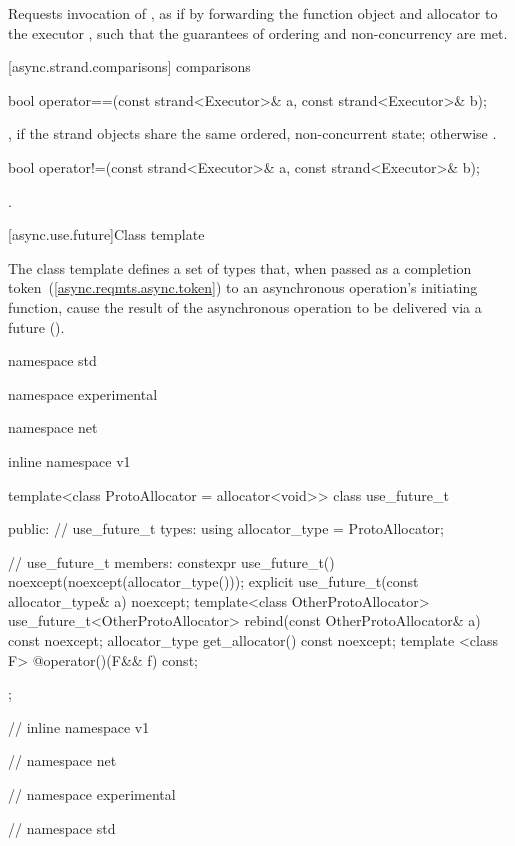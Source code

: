 \begin{itemdescr}
\pnum
\effects Requests invocation of , as if by forwarding the function object  and allocator  to the executor , such that the guarantees of ordering and non-concurrency are met.
\end{itemdescr}



[async.strand.comparisons]{ comparisons}

%
\begin{itemdecl}
bool operator==(const strand<Executor>& a, const strand<Executor>& b);
\end{itemdecl}

\begin{itemdescr}
\pnum
\returns {}, if the strand objects share the same ordered, non-concurrent state; otherwise .
\end{itemdescr}

%
\begin{itemdecl}
bool operator!=(const strand<Executor>& a, const strand<Executor>& b);
\end{itemdecl}

\begin{itemdescr}
\pnum
\returns {}.
\end{itemdescr}




[async.use.future]{Class template }

%
\pnum
The class template  defines a set of types that, when passed as a completion token~(\ref{async.reqmts.async.token}) to an asynchronous operation's initiating function, cause the result of the asynchronous operation to be delivered via a future ().

\begin{codeblock}
namespace std {
namespace experimental {
namespace net {
inline namespace v1 {

  template<class ProtoAllocator = allocator<void>>
  class use_future_t
  {
  public:
    // use_future_t types:
    using allocator_type = ProtoAllocator;

    // use_future_t members:
    constexpr use_future_t() noexcept(noexcept(allocator_type()));
    explicit use_future_t(const allocator_type& a) noexcept;
    template<class OtherProtoAllocator> use_future_t<OtherProtoAllocator>
      rebind(const OtherProtoAllocator& a) const noexcept;
    allocator_type get_allocator() const noexcept;
    template <class F> @\unspec@ operator()(F&& f) const;
  };

} // inline namespace v1
} // namespace net
} // namespace experimental
} // namespace std
\end{codeblock}


